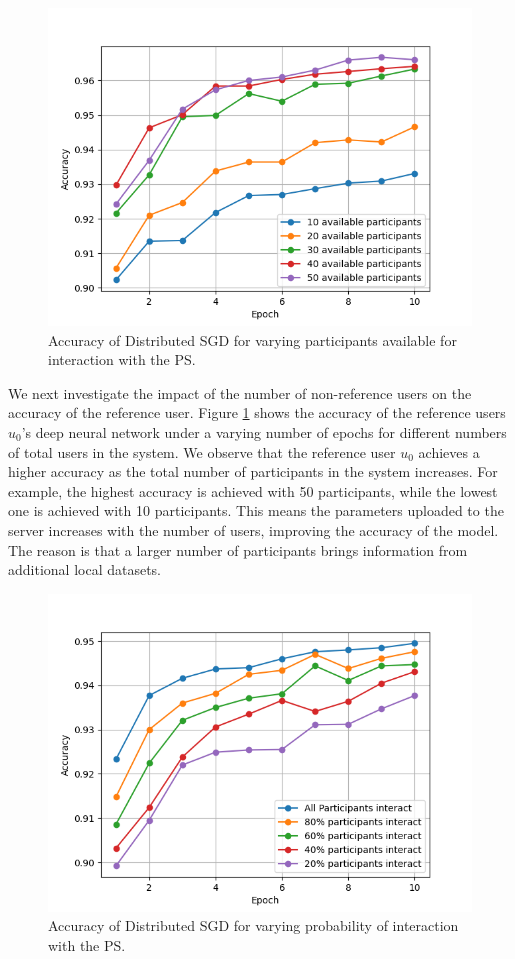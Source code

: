 \documentclass[conference]{IEEEtran}
\begin{document}
\begin{figure}[!h]
\centering
\includegraphics[width=0.9\columnwidth, keepaspectratio]{VaryingPoolofParticipantsGrid}
\caption{Accuracy of Distributed SGD for varying participants available for interaction with the PS.}
\label{fig:VaryingPoolofParticipants}
\end{figure}

We next investigate the impact of the number of non-reference users on the accuracy of the reference user. Figure 
\ref{fig:VaryingPoolofParticipants} shows the accuracy of the reference users $u_0$'s deep neural network under a varying number
of epochs for different numbers of total users in the system. We observe that  the reference user $u_0$ achieves a higher accuracy as
the total number of participants in the system increases. For example, the highest accuracy is achieved with 50 participants, while the
lowest one is achieved with 10 participants. This means the parameters uploaded to the server increases with the number of users, improving 
the accuracy of the model. The reason is that a larger  number of participants brings information from additional local datasets. 

\begin{figure}[!h]
\centering
\includegraphics[width=0.9\columnwidth, keepaspectratio]{VaryingProbabilityInteractionGrid}
\caption{Accuracy of Distributed SGD for varying probability of interaction with the PS. }
\label{fig:VaryingProbabilityInteraction}
\end{figure}
\end{document}
